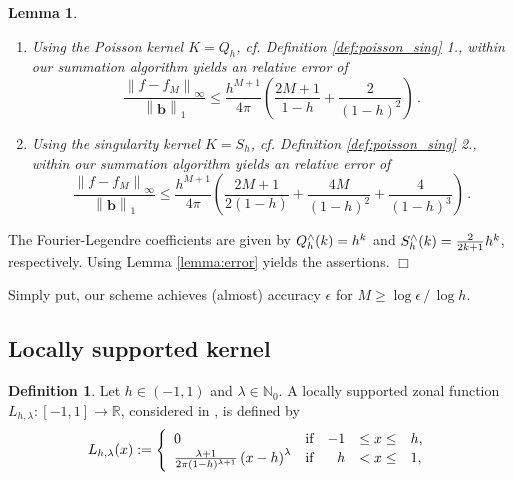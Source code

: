 \documentclass[11pt,a4paper,twoside,bibtotoc]{scrartcl}
\theoremstyle{plain}
\newtheorem{lemma}[theorem]{Lemma}
\theoremstyle{definition}
\newtheorem{definition}[theorem]{Definition}
\theoremstyle{remark}
\newenvironment{proof}{{\bf Proof.}}{$\Box$}
\newcommand{\NZ}{\ensuremath{\mathbb{N}_{0}}}
\newcommand{\R}{\ensuremath{\mathbb{R}}}
\newcommand{\interv}[4]{\ensuremath{\left#1\left.#2,#3\right#4\right.}}
\newcommand{\fun}[2]{\ensuremath{#1{\hspace{-0.4ex}}\left(#2\right)}}
\newcommand{\paren}[1]{\ensuremath{\left(#1\right)}}
\newcommand{\mb}[1]{\mathbf{#1}}
\newcommand{\V}[1]{\mb{#1}}
\numberwithin{equation}{section}
\numberwithin{table}{section}
\numberwithin{figure}{section}
\begin{document}
\begin{lemma}
 \begin{enumerate}
   \item 
Using the Poisson kernel $K=Q_h$, cf. Definition \ref{def:poisson_sing} 1.,
within our summation algorithm yields an relative error of
     \begin{equation}
       \label{error:poisson}
       \frac{\left\|f - f_{M}\right\|_{\infty}}{\left\|\V{b}\right\|_1} \le
       \frac{h^{M+1}}{4\pi}
       \left(\frac{2M+1}{1-h}+\frac{2}{\left(1-h\right)^2}\right)\, .
     \end{equation}
     \item 
Using the singularity kernel $K=S_h$, cf. Definition \ref{def:poisson_sing}
2., within our summation algorithm yields an relative error of 
       \begin{equation}
         \label{error:singular}
         \frac{\left\|f - f_{M}\right\|_{\infty}}{\left\|\V{b}\right\|_1} \le
         \frac{h^{M+1}}{4\pi} \left(\frac{2M+1}{2\left(1-h\right)}+
           \frac{4M}{\left(1-h\right)^2}+
         \frac{4}{\left(1-h\right)^3}\right)\, .
       \end{equation}
 \end{enumerate}
\end{lemma}
\begin{proof}
The Fourier-Legendre coefficients are given by $\fun{Q_{h}^{\wedge}}{k}=h^k$ and
$\fun{S_{h}^{\wedge}}{k}=\frac{2}{2k+1}h^k$, respectively.
Using Lemma \ref{lemma:error} yields the assertions.
\end{proof}
  
Simply put, our scheme achieves (almost) accuracy $\epsilon$ for $M \ge \log\epsilon \,
/ \, \log h$.

\subsection{Locally supported kernel}
\begin{definition}
  Let $h \in \interv{(}{-1}{1}{)}$ and $\lambda \in \NZ$.
  A locally supported zonal function
    $L_{h,\lambda}:\interv{[}{-1}{1}{]} \rightarrow \R$, considered in
    \cite{Sc97}, is defined by
    \[
    \fun{L_{h,\lambda}}{x} := 
    \left\{\begin{array}{l@{\quad \text{if} \quad}rcl} 
        0 & -1 &\le x \le& h, \\
        \frac{\lambda+1}{2\pi(1-h)^{\lambda+1}}\paren{x-h}^{\lambda} &  h & <  x \le& 1,
      \end{array}\right.
    \]
\end{definition}
\end{document}
